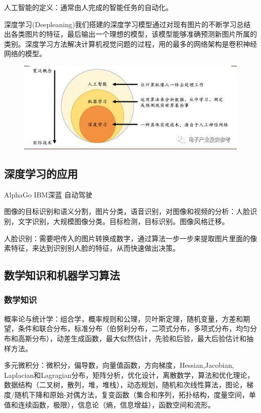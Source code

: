 \documentclass[openbib]{article}
\begin{document}
	人工智能的定义：通常由人完成的智能任务的自动化。
	
	深度学习(Deepleaning)我们搭建的深度学习模型通过对现有图片的不断学习总结出各类图片的特征，最后输出一个理想的模型，该模型能够准确预测新图片所属的类别。深度学习方法解决计算机视觉问题的过程，用的最多的网络架构是卷积神经网络的模型。
	
	\begin{figure}[htbp]
		\centering
		\includegraphics[scale=0.4]{1-1}
	\end{figure}
	\subsection{深度学习的应用}
	AlphaGo IBM深蓝 自动驾驶
	
	图像的目标识别和语义分割，图片分类，语音识别，对图像和视频的分析：人脸识别，文字识别，大规模图像分类。目标检测，目标识别。图像风格迁移。
	
	人脸识别：需要吧传入的图片转换成数字，通过算法一步一步来提取图片里面的像素特征，来达到识别别人脸的特征，从而快速做出决策。
	
	\subsection{数学知识和机器学习算法}
	\subsubsection{数学知识}
	概率论与统计学：组合学，概率规则和公理，贝叶斯定理，随机变量，方差和期望，条件和联合分布，标准分布（伯努利分布，二项式分布，多项式分布，均匀分布和高斯分布），动差生成函数，最大似然估计，先验和后验，最大后验估计和抽样方法。
	
	多元微积分：微积分，偏导数，向量值函数，方向梯度，Hessian,Jacobian,\\ Laplacian和Lagragian分布，矩阵分析，优化设计，离散数学，算法和优化理论，数据结构（二叉树，散列，堆，堆栈），动态规划，随机和次线性算法，图论，梯度/随机下降和原始-对偶方法，复变函数（集合和序列，拓扑结构，度量空间，单值和连续函数，极限），信息论（熵，信息增益），函数空间和流形。
\end{document}
